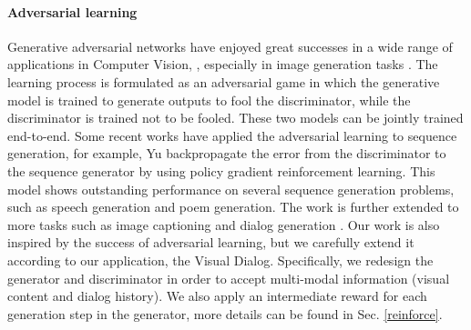 \documentclass[10pt,twocolumn,letterpaper]{article}
\begin{document}
\vspace{-10pt}
\paragraph{Adversarial learning}
Generative adversarial networks \cite{goodfellow2014generative} have enjoyed great successes in a wide range of applications in Computer Vision, \cite{chen2016infogan,radford2015unsupervised,salimans2016improved}, especially in image generation tasks \cite{denton2015deep,zhang2016stackgan}. The learning process is formulated as an adversarial game in which the generative model is trained to generate outputs to fool the discriminator, while the discriminator is trained not to be fooled. These two models can be jointly trained end-to-end. Some recent works have applied the adversarial learning to sequence generation, for example, Yu \etal \cite{yu2017seqgan} backpropagate the error from the discriminator to the sequence generator by using policy gradient reinforcement learning. This model shows outstanding performance on several sequence generation problems, such as speech generation and poem generation. The work is further extended to more tasks such as image captioning \cite{dai2017towards,shetty2017speaking} and dialog  generation \cite{li2017adversarial}. Our work is also inspired by the success of adversarial learning, but we carefully extend it according to our application, \ie the Visual Dialog. Specifically, we redesign the generator and discriminator in order to accept multi-modal information (visual content and dialog history). We also apply an intermediate reward for each generation step in the generator, more details can be found in Sec. \ref{reinforce}.
\end{document}
